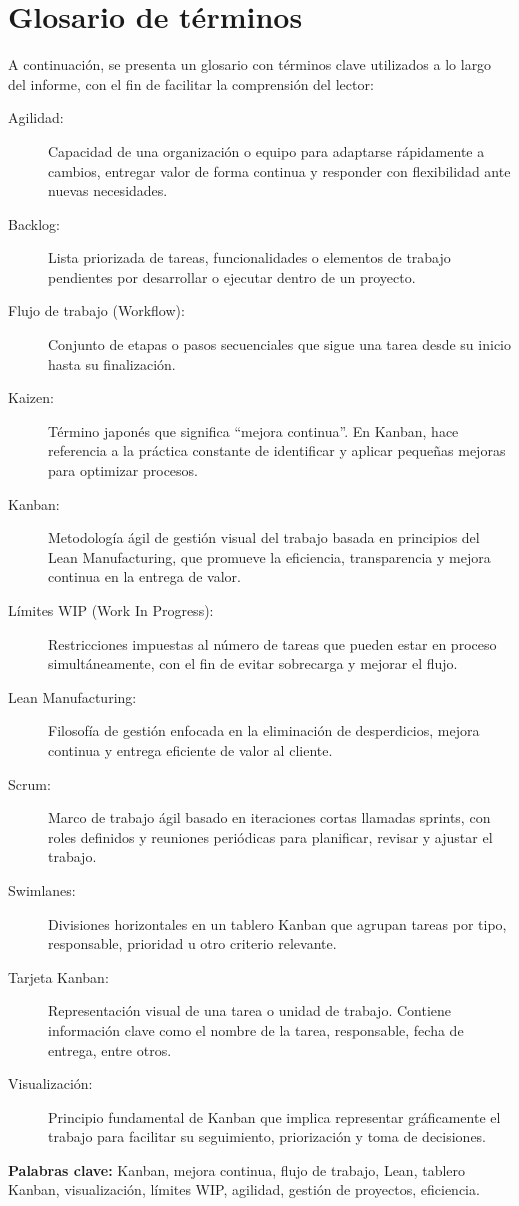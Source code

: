 \section*{Glosario de términos}

A continuación, se presenta un glosario con términos clave utilizados a lo largo del informe, con el fin de facilitar la comprensión del lector:

\begin{description}
    \item[Agilidad:] Capacidad de una organización o equipo para adaptarse rápidamente a cambios, entregar valor de forma continua y responder con flexibilidad ante nuevas necesidades.
    
    \item[Backlog:] Lista priorizada de tareas, funcionalidades o elementos de trabajo pendientes por desarrollar o ejecutar dentro de un proyecto.
    
    \item[Flujo de trabajo (Workflow):] Conjunto de etapas o pasos secuenciales que sigue una tarea desde su inicio hasta su finalización.
    
    \item[Kaizen:] Término japonés que significa “mejora continua”. En Kanban, hace referencia a la práctica constante de identificar y aplicar pequeñas mejoras para optimizar procesos.
    
    \item[Kanban:] Metodología ágil de gestión visual del trabajo basada en principios del Lean Manufacturing, que promueve la eficiencia, transparencia y mejora continua en la entrega de valor.
    
    \item[Límites WIP (Work In Progress):] Restricciones impuestas al número de tareas que pueden estar en proceso simultáneamente, con el fin de evitar sobrecarga y mejorar el flujo.
    
    \item[Lean Manufacturing:] Filosofía de gestión enfocada en la eliminación de desperdicios, mejora continua y entrega eficiente de valor al cliente.
    
    \item[Scrum:] Marco de trabajo ágil basado en iteraciones cortas llamadas sprints, con roles definidos y reuniones periódicas para planificar, revisar y ajustar el trabajo.
    
    \item[Swimlanes:] Divisiones horizontales en un tablero Kanban que agrupan tareas por tipo, responsable, prioridad u otro criterio relevante.
    
    \item[Tarjeta Kanban:] Representación visual de una tarea o unidad de trabajo. Contiene información clave como el nombre de la tarea, responsable, fecha de entrega, entre otros.
    
    \item[Visualización:] Principio fundamental de Kanban que implica representar gráficamente el trabajo para facilitar su seguimiento, priorización y toma de decisiones.
\end{description}

\vspace{0.5cm}

\noindent\textbf{Palabras clave:} Kanban, mejora continua, flujo de trabajo, Lean, tablero Kanban, visualización, límites WIP, agilidad, gestión de proyectos, eficiencia.

